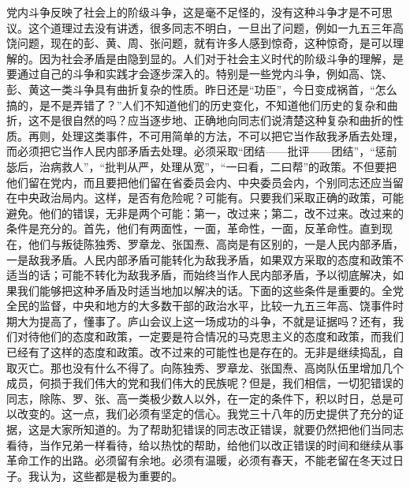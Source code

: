 党内斗争反映了社会上的阶级斗争，这是毫不足怪的，没有这种斗争才是不可思议。这个道理过去没有讲透，很多同志不明白，一旦出了问题，例如一九五三年高饶问题，现在的彭、黄、周、张问题，就有许多人感到惊奇，这种惊奇，是可以理解的。因为社会矛盾是由隐到显的。人们对于社会主义时代的阶级斗争的理解，是要通过自己的斗争和实践才会逐步深入的。特别是一些党内斗争，例如高、饶、彭、黄这一类斗争具有曲折复杂的性质。昨日还是“功臣”，今日变成祸首，“怎么搞的，是不是弄错了？”人们不知道他们的历史变化，不知道他们历史的复杂和曲折，这不是很自然的吗？应当逐步地、正确地向同志们说清楚这种复杂和曲折的性质。再则，处理这类事件，不可用简单的方法，不可以把它当作敌我矛盾去处理，而必须把它当作人民内部矛盾去处理。必须采取“团结——批评——团结”，“惩前毖后，治病救人”，“批判从严，处理从宽”，“一曰看，二曰帮”的政策。不但要把他们留在党内，而且要把他们留在省委员会内、中央委员会内，个别同志还应当留在中央政治局内。这样，是否有危险呢？可能有。只要我们采取正确的政策，可能避免。他们的错误，无非是两个可能：第一，改过来；第二，改不过来。改过来的条件是充分的。首先，他们有两面性，一面，革命性，一面，反革命性。直到现在，他们与叛徒陈独秀、罗章龙、张国焘、高岗是有区别的，一是人民内部矛盾，一是敌我矛盾。人民内部矛盾可能转化为敌我矛盾，如果双方采取的态度和政策不适当的话；可能不转化为敌我矛盾，而始终当作人民内部矛盾，予以彻底解决，如果我们能够把这种矛盾及时适当地加以解决的话。下面的这些条件是重要的。全党全民的监督，中央和地方的大多数干部的政治水平，比较一九五三年高、饶事件时期大为提高了，懂事了。庐山会议上这一场成功的斗争，不就是证据吗？还有，我们对待他们的态度和政策，一定要是符合情况的马克思主义的态度和政策，而我们已经有了这样的态度和政策。改不过来的可能性也是存在的。无非是继续捣乱，自取灭亡。那也没有什么不得了。向陈独秀、罗章龙、张国焘、高岗队伍里增加几个成员，何损于我们伟大的党和我们伟大的民族呢？但是，我们相信，一切犯错误的同志，除陈、罗、张、高一类极少数人以外，在一定的条件下，积以时日，总是可以改变的。这一点，我们必须有坚定的信心。我党三十八年的历史提供了充分的证据，这是大家所知道的。为了帮助犯错误的同志改正错误，就要仍然把他们当同志看待，当作兄弟一样看待，给以热忱的帮助，给他们以改正错误的时间和继续从事革命工作的出路。必须留有余地。必须有温暖，必须有春天，不能老留在冬天过日子。我认为，这些都是极为重要的。


